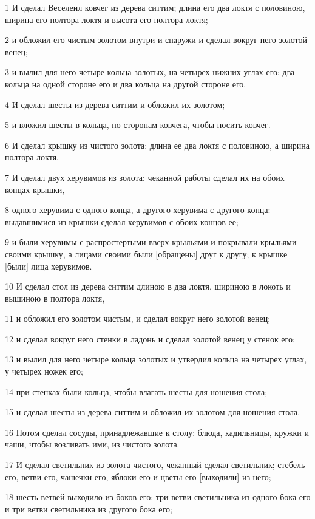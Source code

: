 \par 1 И сделал Веселеил ковчег из дерева ситтим; длина его два локтя с половиною, ширина его полтора локтя и высота его полтора локтя;
\par 2 и обложил его чистым золотом внутри и снаружи и сделал вокруг него золотой венец;
\par 3 и вылил для него четыре кольца золотых, на четырех нижних углах его: два кольца на одной стороне его и два кольца на другой стороне его.
\par 4 И сделал шесты из дерева ситтим и обложил их золотом;
\par 5 и вложил шесты в кольца, по сторонам ковчега, чтобы носить ковчег.
\par 6 И сделал крышку из чистого золота: длина ее два локтя с половиною, а ширина полтора локтя.
\par 7 И сделал двух херувимов из золота: чеканной работы сделал их на обоих концах крышки,
\par 8 одного херувима с одного конца, а другого херувима с другого конца: выдавшимися из крышки сделал херувимов с обоих концов ее;
\par 9 и были херувимы с распростертыми вверх крыльями и покрывали крыльями своими крышку, а лицами своими были [обращены] друг к другу; к крышке [были] лица херувимов.
\par 10 И сделал стол из дерева ситтим длиною в два локтя, шириною в локоть и вышиною в полтора локтя,
\par 11 и обложил его золотом чистым, и сделал вокруг него золотой венец;
\par 12 и сделал вокруг него стенки в ладонь и сделал золотой венец у стенок его;
\par 13 и вылил для него четыре кольца золотых и утвердил кольца на четырех углах, у четырех ножек его;
\par 14 при стенках были кольца, чтобы влагать шесты для ношения стола;
\par 15 и сделал шесты из дерева ситтим и обложил их золотом для ношения стола.
\par 16 Потом сделал сосуды, принадлежавшие к столу: блюда, кадильницы, кружки и чаши, чтобы возливать ими, из чистого золота.
\par 17 И сделал светильник из золота чистого, чеканный сделал светильник; стебель его, ветви его, чашечки его, яблоки его и цветы его [выходили] из него;
\par 18 шесть ветвей выходило из боков его: три ветви светильника из одного бока его и три ветви светильника из другого бока его;

